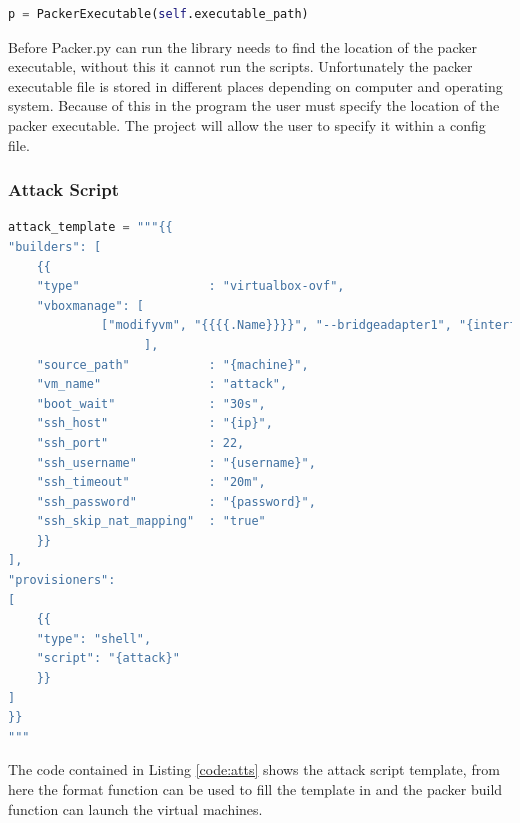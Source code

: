 \begin{lstlisting}[language = python]
p = PackerExecutable(self.executable_path)
\end{lstlisting}

Before Packer.py can run the library needs to find the location of the packer executable, without this it cannot run the scripts. Unfortunately the packer executable file is stored in different places depending on computer and operating system. Because of this in the program the user must specify the location of the packer executable. The project will allow the user to specify it within a config file.

\subsubsection{Attack Script}
\begin{lstlisting}[language = python, caption = Attack Script, label=code:atts]
attack_template = """{{
"builders": [
    {{
    "type"                  : "virtualbox-ovf",
    "vboxmanage": [
             ["modifyvm", "{{{{.Name}}}}", "--bridgeadapter1", "{interface}"]
                   ],
    "source_path"           : "{machine}",
    "vm_name"               : "attack",
    "boot_wait"             : "30s",
    "ssh_host"              : "{ip}",
    "ssh_port"              : 22,
    "ssh_username"          : "{username}",
    "ssh_timeout"           : "20m",
    "ssh_password"          : "{password}",
    "ssh_skip_nat_mapping"  : "true"
    }}
],
"provisioners":
[
    {{
    "type": "shell",
    "script": "{attack}"
    }}
]
}}
"""
\end{lstlisting}

The code contained in Listing \ref{code:atts} shows the attack script template, from here the format function can be used to fill the template in and the packer build function can launch the virtual machines.

